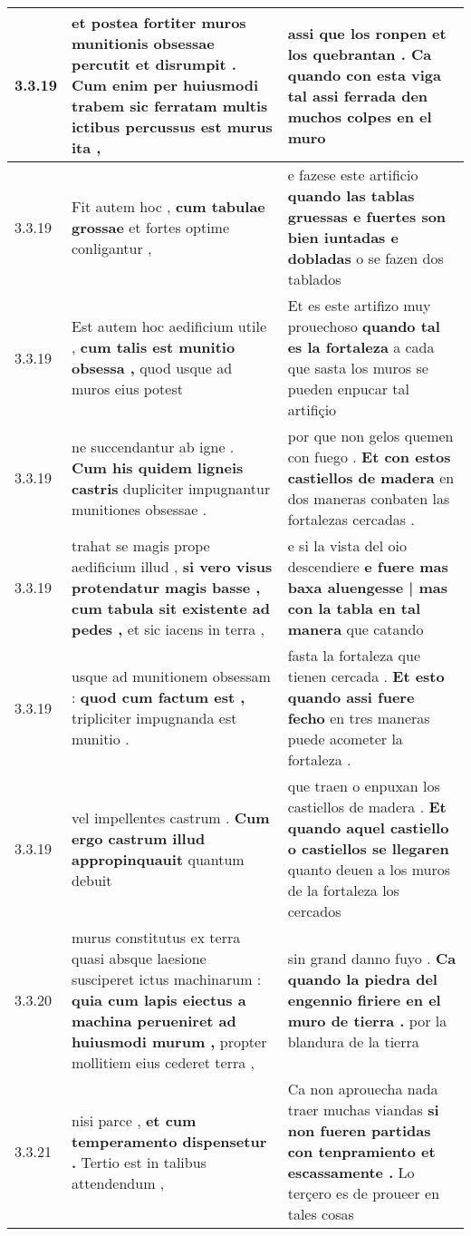 \begin{tabular}{|p{1cm}|p{6.5cm}|p{6.5cm}|}
3.3.19 & et postea fortiter muros munitionis obsessae percutit et disrumpit . \textbf{ Cum enim per huiusmodi trabem sic ferratam } multis ictibus percussus est murus ita , & assi que los ronpen et los quebrantan . \textbf{ Ca quando con esta viga tal } assi ferrada den muchos colpes en el muro \\\hline
3.3.19 & Fit autem hoc , \textbf{ cum tabulae grossae } et fortes optime conligantur , & e fazese este artificio \textbf{ quando las tablas gruessas e fuertes son bien iuntadas e dobladas } o se fazen dos tablados \\\hline
3.3.19 & Est autem hoc aedificium utile , \textbf{ cum talis est munitio obsessa , } quod usque ad muros eius potest & Et es este artifizo muy prouechoso \textbf{ quando tal es la fortaleza } a cada que sasta los muros se pueden enpucar tal artifiçio \\\hline
3.3.19 & ne succendantur ab igne . \textbf{ Cum his quidem ligneis castris } dupliciter impugnantur munitiones obsessae . & por que non gelos quemen con fuego . \textbf{ Et con estos castiellos de madera } en dos maneras conbaten las fortalezas cercadas . \\\hline
3.3.19 & trahat se magis prope aedificium illud , \textbf{ si vero visus protendatur magis basse , cum tabula sit existente ad pedes , } et sic iacens in terra , & e si la vista del oio descendiere \textbf{ e fuere mas baxa aluengesse | mas con la tabla en tal manera } que catando \\\hline
3.3.19 & usque ad munitionem obsessam : \textbf{ quod cum factum est , } tripliciter impugnanda est munitio . & fasta la fortaleza que tienen cercada . \textbf{ Et esto quando assi fuere fecho } en tres maneras puede acometer la fortaleza . \\\hline
3.3.19 & vel impellentes castrum . \textbf{ Cum ergo castrum illud appropinquauit } quantum debuit & que traen o enpuxan los castiellos de madera . \textbf{ Et quando aquel castiello o castiellos se llegaren } quanto deuen a los muros de la fortaleza los cercados \\\hline
3.3.20 & murus constitutus ex terra quasi absque laesione susciperet ictus machinarum : \textbf{ quia cum lapis eiectus a machina perueniret ad huiusmodi murum , } propter mollitiem eius cederet terra , & sin grand danno fuyo . \textbf{ Ca quando la piedra del engennio firiere en el muro de tierra . } por la blandura de la tierra \\\hline
3.3.21 & nisi parce , \textbf{ et cum temperamento dispensetur . } Tertio est in talibus attendendum , & Ca non aprouecha nada traer muchas viandas \textbf{ si non fueren partidas con tenpramiento et escassamente . } Lo terçero es de proueer en tales cosas \\\hline

\end{tabular}
